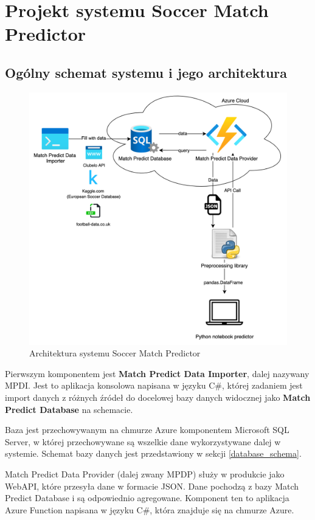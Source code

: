 \chapter{Projekt systemu Soccer Match Predictor}
\section{Ogólny schemat systemu i jego architektura}
    \begin{figure}[h] 
        \centering\includegraphics[width=\textwidth]{figures/MatchPredictorArchitecture.png}
        \caption{Architektura systemu Soccer Match Predictor}\label{fig:arch1}
    \end{figure}
    \newpage

\noindent Pierwszym komponentem jest \textbf{Match Predict Data Importer}, dalej nazywany MPDI. Jest to aplikacja konsolowa napisana w języku C\#, której zadaniem jest import danych z różnych źródeł do docelowej bazy danych widocznej jako \textbf{Match Predict Database} na schemacie.

Baza jest przechowywanym na chmurze Azure komponentem Microsoft SQL Server, w której przechowywane są wszelkie dane wykorzystywane dalej w systemie. Schemat bazy danych jest przedstawiony w sekcji \ref{database_schema}.

Match Predict Data Provider (dalej zwany MPDP) służy w produkcie jako WebAPI, które przesyła dane w formacie JSON. Dane pochodzą z bazy Match Predict Database i są odpowiednio agregowane. Komponent ten to aplikacja Azure Function napisana w języku C\#, która znajduje się na chmurze Azure.\\



